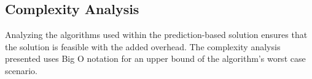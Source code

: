 \subsection{Complexity Analysis}
Analyzing the algorithms used within the prediction-based solution ensures that the solution is feasible with the added overhead. The complexity analysis presented uses Big O notation for an upper bound of the algorithm's worst case scenario.



